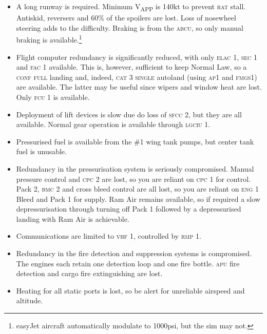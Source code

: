 \documentclass[a5paper,11pt,twoside]{book}
\newcommand{\ac}[1]{{\scshape\MakeLowercase{#1}}}
\newcommand{\V}[1]{V\textsubscript{#1}}
\begin{document}
\begin{itemize}

\item A long runway is required. Minimum \V{APP} is 140kt to prevent \ac{RAT}
  stall. Antiskid, reversers and 60\% of the spoilers are lost. Loss of
  nosewheel steering adds to the difficulty. Braking is from the \ac{ABCU}, so only
  manual braking is available.\footnote{easyJet aircraft automatically modulate
  to 1000psi, but the sim may not.}

  \item Flight computer redundancy is significantly reduced, with only \ac{ELAC} 1,
    \ac{SEC} 1 and \ac{FAC} 1 available. This is, however, sufficient to keep Normal Law,
    so a \ac{CONF} \ac{FULL} landing and, indeed, \ac{CAT} 3 \ac{SINGLE} autoland (using \ac{AP}1 and
    \ac{FMGS}1) are available. The latter may be useful since wipers and window heat
    are lost. Only \ac{FCU} 1 is available.

  \item Deployment of lift devices is slow due do loss of \ac{SFCC} 2, but they are
    all available. Normal gear operation is available through \ac{LGCIU} 1.

  \item Pressurised fuel is available from the \#1 wing tank pumps, but center
    tank fuel is unusable.

  \item Redundancy in the pressurisation system is seriously compromised. Manual
    pressure control and \ac{CPC} 2 are lost, so you are reliant on \ac{CPC} 1 for
    control. Pack 2, \ac{BMC} 2 and cross bleed control are all lost, so you are
    reliant on \ac{ENG} 1 Bleed and Pack 1 for supply. Ram Air remains available, so
    if required a slow depressurisation through turning off Pack 1 followed by a
    depressurised landing with Ram Air is achievable.

  \item Communications are limited to \ac{VHF} 1, controlled by \ac{RMP} 1.

  \item Redundancy in the fire detection and suppression systems is
    compromised. The engines each retain one detection loop and one fire
    bottle. \ac{APU} fire detection and cargo fire extinguishing are lost.

  \item Heating for all static ports is lost, so be alert for unreliable
    airspeed and altitude.
\end{itemize}
\end{document}
